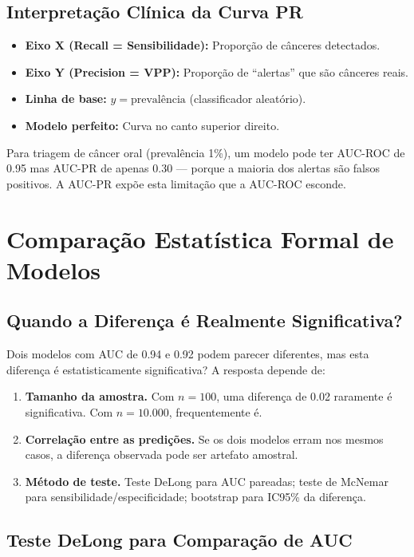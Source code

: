 \subsection{Interpretação Clínica da Curva PR}

\begin{itemize}
    \item \textbf{Eixo X (Recall = Sensibilidade):} Proporção de cânceres detectados.
    \item \textbf{Eixo Y (Precision = VPP):} Proporção de ``alertas'' que são cânceres reais.
    \item \textbf{Linha de base:} $y = \text{prevalência}$ (classificador aleatório).
    \item \textbf{Modelo perfeito:} Curva no canto superior direito.
\end{itemize}

Para triagem de câncer oral (prevalência 1\%), um modelo pode ter AUC-ROC de 0.95 mas AUC-PR de apenas 0.30 — porque a maioria dos alertas são falsos positivos. A AUC-PR expõe esta limitação que a AUC-ROC esconde.

\section{Comparação Estatística Formal de Modelos}

\subsection{Quando a Diferença é Realmente Significativa?}

Dois modelos com AUC de 0.94 e 0.92 podem parecer diferentes, mas esta diferença é estatisticamente significativa? A resposta depende de:

\begin{enumerate}
    \item \textbf{Tamanho da amostra.} Com $n = 100$, uma diferença de 0.02 raramente é significativa. Com $n = 10.000$, frequentemente é.
    \item \textbf{Correlação entre as predições.} Se os dois modelos erram nos mesmos casos, a diferença observada pode ser artefato amostral.
    \item \textbf{Método de teste.} Teste DeLong para AUC pareadas; teste de McNemar para sensibilidade/especificidade; bootstrap para IC95\% da diferença.
\end{enumerate}

\subsection{Teste DeLong para Comparação de AUC}

